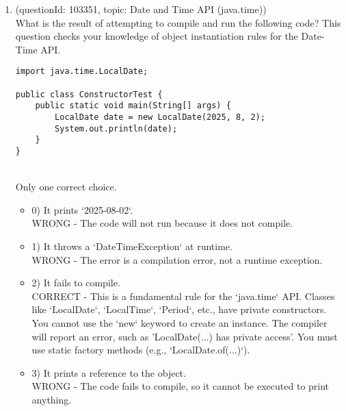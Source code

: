 \documentclass[12pt]{article}
\begin{document}
\begin{enumerate}[label=(\arabic*)]
\begin{itemize}
\end{itemize}
\item (questionId: 103351, topic: Date and Time API (java.time)) \\ 
What is the result of attempting to compile and run the following code? This question checks your knowledge of object instantiation rules for the Date-Time API.
\begin{verbatim}
import java.time.LocalDate;

public class ConstructorTest {
    public static void main(String[] args) {
        LocalDate date = new LocalDate(2025, 8, 2);
        System.out.println(date);
    }
}
\end{verbatim}
\\ \noindent Only one correct choice. 
\begin{itemize}
\item 0) It prints `2025-08-02`.
 \\ 
WRONG - The code will not run because it does not compile.

\item 1) It throws a `DateTimeException` at runtime.
 \\ 
WRONG - The error is a compilation error, not a runtime exception.

\item 2) It fails to compile.
 \\ 
CORRECT - This is a fundamental rule for the `java.time` API. Classes like `LocalDate`, `LocalTime`, `Period`, etc., have private constructors. You cannot use the `new` keyword to create an instance. The compiler will report an error, such as 'LocalDate(...) has private access'. You must use static factory methods (e.g., `LocalDate.of(...)`).

\item 3) It prints a reference to the object.
 \\ 
WRONG - The code fails to compile, so it cannot be executed to print anything.


\end{itemize}
\end{enumerate}
\end{document}
